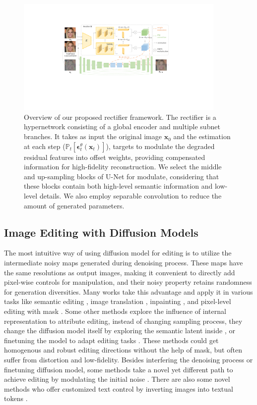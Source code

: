 \documentclass[letterpaper]{article} %
\begin{document}
\begin{figure}[t]
    \centering
    \includegraphics[width=0.9\textwidth]{Figs/fig2.pdf}
    \caption{Overview of our proposed rectifier framework. The rectifier is a hypernetwork consisting of a global encoder and multiple subnet branches.
    It takes as input the original image $\bm{x}_0$ and the estimation at each step ($\mathbb{P}_t[\bm{\epsilon}_t^\theta(\bm{x}_t)]$), targets to modulate the degraded residual features into offset weights, providing compensated information for high-fidelity reconstruction.
    We select the middle and up-sampling blocks of U-Net for modulate, considering that these blocks contain both high-level semantic information and low-level details.
    We also employ separable convolution to reduce the amount of generated parameters.}
    \label{fig2}
\end{figure}

\subsection{Image Editing with Diffusion Models}
The most intuitive way of using diffusion model for editing is to utilize the intermediate noisy maps generated during denoising process. These maps have the same resolutions as output images, making it convenient to directly add pixel-wise controls for manipulation, and their noisy property retains randomness for generation diversities. Many works take this advantage and apply it in various tasks like semantic editing \cite{choi2021ilvr}, image translation \cite{meng2021sdedit}, inpainting \cite{lugmayr2022repaint}, and pixel-level editing with mask \cite{nichol2021glide,yang2023paint,avrahami2022blended}. Some other methods explore the influence of internal representation to attribute editing, instead of changing sampling process, they change the diffusion model itself by exploring the semantic latent inside \cite{kwon2022diffusion}, or finetuning the model to adapt editing tasks \cite{kim2022diffusionclip, hertz2022prompt, kawar2023imagic}. These methods could get homogenous and robust editing directions without the help of mask, but often suffer from distortion and low-fidelity. Besides interfering the denoising process or finetuning diffusion model, some methods take a novel yet different path to achieve editing by modulating the initial noise \cite{mao2023guided}. There are also some novel methods who offer customized text control by inverting images into textual tokens \cite{gal2022image, mokady2023null}.
\end{document}
